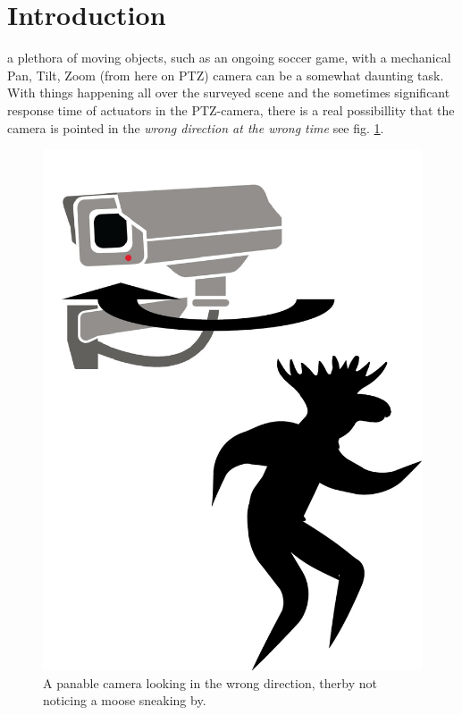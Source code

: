 \section{Introduction}


 a plethora of moving objects, such as an ongoing soccer game, with a mechanical Pan, Tilt, Zoom (from here on PTZ) camera can be a somewhat daunting task.
With things happening all over the surveyed scene and the sometimes significant response time of actuators in the PTZ-camera, there is a real possibillity that the camera is pointed in the {\it wrong direction at the wrong time} see fig. \ref{fig:problem}.

\begin{figure}[H]
	\centering
	\includegraphics[width=0.5 \columnwidth]{../results/images/PTZ_problem.jpg}
	\caption{A panable camera looking in the wrong direction, therby not noticing a moose sneaking by.}
	\label{fig:problem}
\end{figure}

